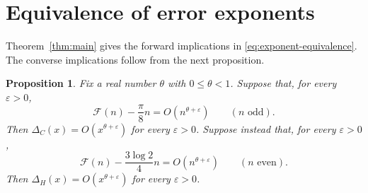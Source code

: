 \documentclass[11pt]{article}
\newtheorem{proposition}[theorem]{Proposition}
\newcommand{\FF}{\mathcal F}
\newcommand{\eps}{\varepsilon}
\begin{document}
\section{Equivalence of error exponents}

Theorem~\ref{thm:main} gives the forward implications in
\eqref{eq:exponent-equivalence}. The converse implications follow from the
next proposition.

\begin{proposition}\label{prop:converse}
Fix a real number $\theta$ with $0\leq\theta<1$.
Suppose that, for every $\eps>0$,
\[
 \FF(n)-\frac{\pi}{8}n=O(n^{\theta+\eps})
 \qquad (n\text{ odd}).
\]
Then $\Delta_C(x)=O(x^{\theta+\eps})$ for every $\eps>0$.
Suppose instead that, for every $\eps>0$,
\[
 \FF(n)-\frac{3\log 2}{4}n=O(n^{\theta+\eps})
 \qquad (n\text{ even}).
\]
Then $\Delta_H(x)=O(x^{\theta+\eps})$ for every $\eps>0$.
\end{proposition}
\end{document}
